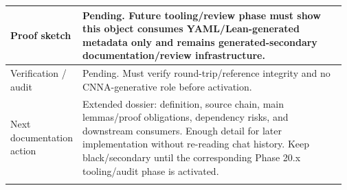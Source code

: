 \begin{longtable}{L{0.16\linewidth} L{0.81\linewidth}}
Proof sketch & Pending. Future tooling/\allowbreak{}review phase must show this object consumes YAML/\allowbreak{}Lean-generated metadata only and remains generated-secondary documentation/\allowbreak{}review infrastructure.\\
\hline\addlinespace[0.20em]
Verification /\allowbreak{} audit & Pending. Must verify round-trip/\allowbreak{}reference integrity and no CNNA-generative role before activation.\\
\hline\addlinespace[0.20em]
Next documentation action & Extended dossier: definition, source chain, main lemmas/\allowbreak{}proof obligations, dependency risks, and downstream consumers. Enough detail for later implementation without re-reading chat history. Keep black/\allowbreak{}secondary until the corresponding Phase 20.x tooling/\allowbreak{}audit phase is activated.\\
\hline\addlinespace[0.20em]
\end{longtable}
